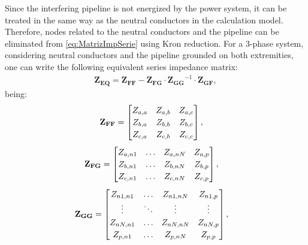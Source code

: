 \documentclass[conference]{IEEEtran}
\begin{document}
Since the interfering pipeline is not energized by the power system, it can be treated in the same way as the neutral conductors in the calculation model. Therefore, nodes related to the neutral conductors and the pipeline can be eliminated from \eqref{eq:MatrizImpSerie} using Kron reduction. For a 3-phase system, considering neutral conductors and the pipeline grounded on both extremities, one can write the following equivalent series impedance matrix:
\begin{equation}\label{eq:MatrizZEq}
	\begin{aligned}
		\mathbf{Z_{EQ}}=\mathbf{Z_{FF}}-\mathbf{Z_{FG}}\cdot\mathbf{Z_{GG}}^{-1}\cdot\mathbf{Z_{GF}},
	\end{aligned}
\end{equation}
being:
\begin{equation}\label{eq:MatrizFF}
	\begin{aligned}
		\arraycolsep=0.8pt %
		\medmuskip = -2mu %
		\def\arraystretch{1.2}
		&\mathbf{Z_{FF}}
		=
		\begin{bmatrix}
			Z_{a,a} & Z_{a,b} & Z_{a,c}  \\
			Z_{b,a} & Z_{b,b} & Z_{b,c} \\
			Z_{c,a} & Z_{c,b} & Z_{c,c} \\
		\end{bmatrix},
	\end{aligned}
\end{equation}
\begin{equation}\label{eq:MatrizFG}
	\begin{aligned}
		\arraycolsep=0.8pt %
		\medmuskip = -2mu %
		\def\arraystretch{1.2}
		&\mathbf{Z_{FG}}
		=
		\begin{bmatrix}
			Z_{a,n1} & \ldots & Z_{a,nN} & Z_{a,p}  \\
			Z_{b,n1} & \ldots & Z_{b,nN} & Z_{b,p} \\
			Z_{c,n1} & \ldots & Z_{c,nN} & Z_{c,p} \\
		\end{bmatrix}, 
	\end{aligned}
\end{equation}
\begin{equation}\label{eq:MatrizGG}
	\begin{aligned}
		\arraycolsep=0.8pt %
		\medmuskip = -2mu %
		\def\arraystretch{1.2}
		&\mathbf{Z_{GG}}
		=
		\begin{bmatrix}
			Z_{n1,n1} & \ldots & Z_{n1,nN} & Z_{n1,p}  \\
			\vdots & \ddots & \vdots & \vdots \\
			Z_{nN,n1} & \ldots & Z_{nN,nN} & Z_{nN,p} \\
			Z_{p,n1} & \ldots & Z_{p,nN} & Z_{p,p} \\
		\end{bmatrix},
	\end{aligned}
\end{equation}
\end{document}
